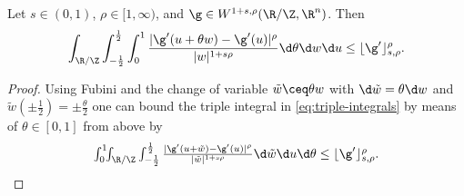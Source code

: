 \begin{lemma}
\label{lem:triple-integrals}
Let $s\in (0,1)$, $\rho\in [1,\infty)$, and $\g\in W^{1+s,\rho}(\R/\Z,\R^n)$.
Then
\begin{equation}\label{eq:triple-integrals}
\int_{\R/\Z}\int_{-\frac{1}{2}}^\frac{1}{2}\int_0^1\frac{|\g'(u+\theta w)-\g'(u)|^\rho}{
|w|^{1+s\rho}}\d\theta\d w\d u\le \lfloor\g'\rfloor_{s,\rho}^\rho.
\end{equation}
\end{lemma}
\begin{proof}
Using Fubini and the change of variable $\tilde{w} \ceq \theta w$ with $\d \tilde{w}=
\theta\d w$ and $\tilde{w}(\pm\frac{1}{2})=\pm\frac{\theta}2$ one can bound 
the
triple integral in \cref{eq:triple-integrals} by means of $\theta\in [0,1]$
from above by
\begin{equation}\label{eq:triple-integral-upper-bound}\textstyle
\int_0^1\!\!\int_{\R/\Z}\int_{-\frac{1}{2}}^\frac{1}{2}\frac{|\g'(u+\tilde{w})-\g'(u)|^\rho}{|\tilde{w}|^{1+s\rho}}\d \tilde{w}\d u\d\theta\le 
\lfloor\g'\rfloor_{s,\rho}^\rho.
\end{equation}
\end{proof}





